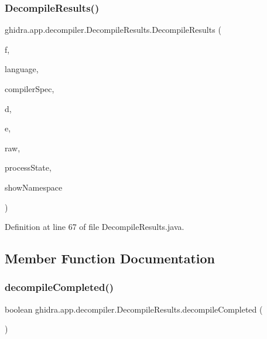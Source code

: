 \subsubsection{\texorpdfstring{DecompileResults()}{DecompileResults()}}
{\footnotesize\ttfamily ghidra.\+app.\+decompiler.\+Decompile\+Results.\+Decompile\+Results (\begin{DoxyParamCaption}\item[{Function}]{f,  }\item[{Language}]{language,  }\item[{Compiler\+Spec}]{compiler\+Spec,  }\item[{Pcode\+Data\+Type\+Manager}]{d,  }\item[{String}]{e,  }\item[{Input\+Stream}]{raw,  }\item[{Decompile\+Process.\+Dispose\+State}]{process\+State,  }\item[{boolean}]{show\+Namespace }\end{DoxyParamCaption})\hspace{0.3cm}{\ttfamily [inline]}}



Definition at line 67 of file Decompile\+Results.\+java.



\subsection{Member Function Documentation}
\mbox{\label{classghidra_1_1app_1_1decompiler_1_1_decompile_results_a2b822a34cffee3be06469c05330321bb}} 
\subsubsection{\texorpdfstring{decompileCompleted()}{decompileCompleted()}}
{\footnotesize\ttfamily boolean ghidra.\+app.\+decompiler.\+Decompile\+Results.\+decompile\+Completed (\begin{DoxyParamCaption}{ }\end{DoxyParamCaption})\hspace{0.3cm}{\ttfamily [inline]}}

